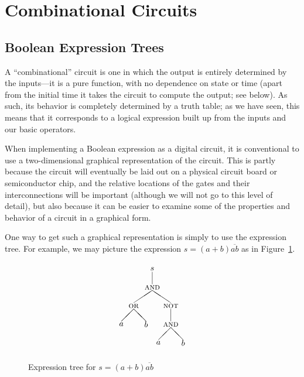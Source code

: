 
\section{Combinational Circuits}
\subsection{Boolean Expression Trees}
A ``combinational'' circuit is one in which the output is entirely determined by the inputs---it is a pure function, with no dependence on state or time (apart from the initial time it takes the circuit to compute the output; see below). As such, its behavior is completely determined by a truth table; as we have seen, this means that it corresponds to a logical expression built up from the inputs and our basic operators.

When implementing a Boolean expression as a digital circuit, it is conventional to use a two-dimensional graphical representation of the circuit. This is partly because the circuit will eventually be laid out on a physical circuit board or semiconductor chip, and the relative locations of the gates and their interconnections will be important (although we will not go to this level of detail), but also because it can be easier to examine some of the properties and behavior of a circuit in a graphical form.

One way to get such a graphical representation is simply to use the expression tree. For example, we may picture the expression $s=(a+b)\overline{ab}$ as in Figure~\ref{fig:exprtree}.
\begin{figure}
\[ \setlength{\unitlength}{0.75pt}
\begin{picture}(120,140)
\put(10,40){\makebox(0,0){$a$}}
\put(50,40){\makebox(0,0){$b$}}
\put(30,70){\makebox(0,0){\textsc{or}}}
\put(10,45){\line(1,1){20}}
\put(50,45){\line(-1,1){20}}
\put(70,10){\makebox(0,0){$a$}}
\put(110,10){\makebox(0,0){$b$}}
\put(90,40){\makebox(0,0){\textsc{and}}}
\put(70,15){\line(1,1){20}}
\put(110,15){\line(-1,1){20}}
\put(90,70){\makebox(0,0){\textsc{not}}}
\put(90,45){\line(0,1){20}}
\put(60,100){\makebox(0,0){\textsc{and}}}
\put(30,75){\line(3,2){30}}
\put(90,75){\line(-3,2){30}}
\put(60,130){\makebox(0,0){$s$}}
\put(60,105){\line(0,1){20}}
\end{picture} \]
\caption{Expression tree for $s=(a+b)\overline{ab}$}
\label{fig:exprtree}
\end{figure}

